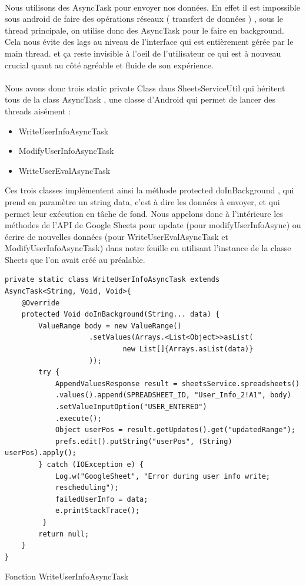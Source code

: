 \documentclass[../main.tex]{subfiles}
\begin{document}
\paragraph{}
Nous utilisons des AsyncTask pour envoyer nos données. En effet il est impossible sous android de faire des opérations réseaux ( transfert de données ) , sous le thread principale, on utilise donc des AsyncTask pour le faire en background. Cela nous évite des lags au niveau de l’interface qui est entièrement gérée par le main thread.
et ça reste invisible à l’oeil de l’utilisateur ce qui est à nouveau crucial quant au côté agréable et fluide de son expérience.
\paragraph{}
Nous avons donc trois static private Class dans SheetsServiceUtil qui héritent tous de la class AsyncTask , une classe d’Android qui permet de lancer des threads aisément : 
 \begin{itemize}
\item WriteUserInfoAsyncTask
\item ModifyUserInfoAsyncTask
\item WriteUserEvalAsyncTask
\end{itemize}
Ces trois classes implémentent ainsi la méthode protected doInBackground , qui prend en paramètre un string data, c’est à dire les données à envoyer, et qui permet leur exécution en tâche de fond.
Nous appelons donc à l'intérieure les méthodes de l’API de Google Sheets pour update (pour modifyUserInfoAsync) 
ou écrire de nouvelles données (pour WriteUserEvalAsyncTask et ModifyUserInfoAsyncTask) dans notre feuille en utilisant l’instance de la classe Sheets que l’on avait créé au préalable.
\hfill \break 
\begin{lstlisting}[tabsize=3]
private static class WriteUserInfoAsyncTask extends 
AsyncTask<String, Void, Void>{
	@Override
	protected Void doInBackground(String... data) {
		ValueRange body = new ValueRange()
                    .setValues(Arrays.<List<Object>>asList(
                            new List[]{Arrays.asList(data)}
                    ));
		try {
			AppendValuesResponse result = sheetsService.spreadsheets()
			.values().append(SPREADSHEET_ID, "User_Info_2!A1", body)
			.setValueInputOption("USER_ENTERED")
			.execute();
			Object userPos = result.getUpdates().get("updatedRange");
			prefs.edit().putString("userPos", (String) userPos).apply();
		} catch (IOException e) {
			Log.w("GoogleSheet", "Error during user info write; 
			rescheduling");
			failedUserInfo = data;
			e.printStackTrace();
		 }
		return null;
	}
}
\end{lstlisting}
Fonction WriteUserInfoAsyncTask
\end{document}
